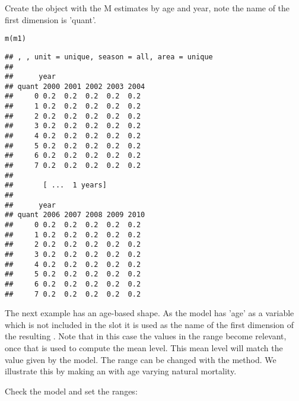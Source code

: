 \documentclass[a4paper,english,10pt]{article}\usepackage[]{graphicx}\usepackage[]{color}
\makeatletter
\newcommand{\hlstd}[1]{\textcolor[rgb]{0.196,0.196,0.196}{#1}}%
\newcommand{\hlkwd}[1]{\textcolor[rgb]{0.78,0.227,0.412}{#1}}%
\newenvironment{kframe}{%
 \def\at@end@of@kframe{}%
 \ifinner\ifhmode%
  \def\at@end@of@kframe{\end{minipage}}%
  \begin{minipage}{\columnwidth}%
 \fi\fi%
 \def\FrameCommand##1{\hskip\@totalleftmargin \hskip-\fboxsep
 \colorbox{shadecolor}{##1}\hskip-\fboxsep
     \hskip-\linewidth \hskip-\@totalleftmargin \hskip\columnwidth}%
 \MakeFramed {\advance\hsize-\width
   \@totalleftmargin\z@ \linewidth\hsize
   \@setminipage}}%
 {\par\unskip\endMakeFramed%
 \at@end@of@kframe}
\newenvironment{knitrout}{}{} %
\makeatother
\begin{document}
Create the object with the M estimates by age and year, note the name of the first dimension is 'quant'.

\begin{knitrout}
\color{fgcolor}\begin{kframe}
\begin{alltt}
\hlkwd{m}\hlstd{(m1)}
\end{alltt}
\begin{verbatim}
## , , unit = unique, season = all, area = unique
## 
##      year
## quant 2000 2001 2002 2003 2004
##     0 0.2  0.2  0.2  0.2  0.2 
##     1 0.2  0.2  0.2  0.2  0.2 
##     2 0.2  0.2  0.2  0.2  0.2 
##     3 0.2  0.2  0.2  0.2  0.2 
##     4 0.2  0.2  0.2  0.2  0.2 
##     5 0.2  0.2  0.2  0.2  0.2 
##     6 0.2  0.2  0.2  0.2  0.2 
##     7 0.2  0.2  0.2  0.2  0.2 
## 
##       [ ...  1 years]
## 
##      year
## quant 2006 2007 2008 2009 2010
##     0 0.2  0.2  0.2  0.2  0.2 
##     1 0.2  0.2  0.2  0.2  0.2 
##     2 0.2  0.2  0.2  0.2  0.2 
##     3 0.2  0.2  0.2  0.2  0.2 
##     4 0.2  0.2  0.2  0.2  0.2 
##     5 0.2  0.2  0.2  0.2  0.2 
##     6 0.2  0.2  0.2  0.2  0.2 
##     7 0.2  0.2  0.2  0.2  0.2
\end{verbatim}
\end{kframe}
\end{knitrout}

The next example has an age-based shape. As the  model has 'age' as a variable which is not included in the  slot it is used as the name of the first dimension of the resulting . Note that in this case the  values in the range become relevant, once that  is used to compute the mean level. This mean level will match the value given by the  model. The  range can be changed with the  method. We illustrate this by making an  with age varying natural mortality. 

Check the model and set the ranges:
\end{document}
